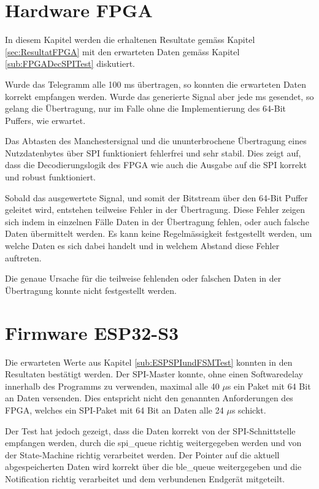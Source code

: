 \section{Hardware FPGA}
\label{sec:DiskussionHardwareFPGA}
In diesem Kapitel werden die erhaltenen Resultate gemäss Kapitel \ref{sec:ResultatFPGA} mit den erwarteten Daten gemäss Kapitel \ref{sub:FPGADecSPITest} diskutiert.

Wurde das Telegramm alle 100 ms übertragen, so konnten die erwarteten Daten korrekt empfangen werden. Wurde das generierte Signal aber jede ms gesendet, so gelang die Übertragung, nur im Falle ohne die Implementierung des 64-Bit Puffers, wie erwartet.

Das Abtasten des Manchestersignal und die ununterbrochene Übertragung eines Nutzdatenbytes über SPI funktioniert fehlerfrei und sehr stabil.
Dies zeigt auf, dass die Decodierungslogik des FPGA wie auch die Ausgabe auf die SPI korrekt und robust funktioniert.

Sobald das ausgewertete Signal, und somit der Bitstream über den 64-Bit Puffer geleitet wird, entstehen teilweise Fehler in der Übertragung.
Diese Fehler zeigen sich indem in einzelnen Fälle Daten in der Übertragung fehlen, oder auch falsche Daten übermittelt werden.
Es kann keine Regelmässigkeit festgestellt werden, um welche Daten es sich dabei handelt und in welchem Abstand diese Fehler auftreten.

Die genaue Ursache für die teilweise fehlenden oder falschen Daten in der Übertragung konnte nicht festgestellt werden.



\section{Firmware ESP32-S3}
\label{sec:DiskussionFirmwareESP32}
Die erwarteten Werte aus Kapitel \ref{sub:ESPSPIundFSMTest} konnten in den Resultaten bestätigt werden. Der SPI-Master konnte, ohne einen Softwaredelay innerhalb des Programms zu verwenden, maximal alle 40 $\mu$s ein Paket mit 64 Bit an Daten versenden. Dies entspricht nicht den genannten Anforderungen des FPGA, welches ein SPI-Paket mit 64 Bit an Daten alle 24 $\mu$s schickt. 

Der Test hat jedoch gezeigt, dass die Daten korrekt von der SPI-Schnittstelle empfangen werden, durch die spi\_queue richtig weitergegeben werden und von der State-Machine richtig verarbeitet werden. Der Pointer auf die aktuell abgespeicherten Daten wird korrekt über die ble\_queue weitergegeben und die Notification richtig verarbeitet und dem verbundenen Endgerät mitgeteilt. 

